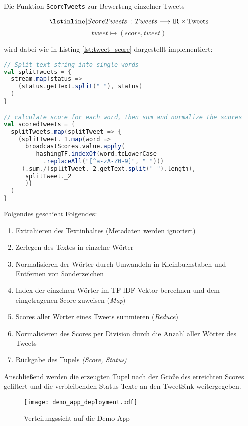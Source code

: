 Die Funktion \lstinline|ScoreTweets| zur Bewertung einzelner Tweets

\[\lstinline|ScoreTweets|: Tweets \longrightarrow \rm I\!R \times Tweets\]
\[tweet \mapsto (score, tweet)\]

wird dabei wie in Listing \ref{lst:tweet_score} dargestellt implementiert:

\begin{lstlisting}[language=Scala,caption={Bewertung von Tweets},label={lst:tweet_score}]
// Split text string into single words
val splitTweets = {
  stream.map(status =>
    (status.getText.split(" "), status)
  )
}

// calculate score for each word, then sum and normalize the scores
val scoredTweets = {
  splitTweets.map(splitTweet => {
    (splitTweet._1.map(word =>
      broadcastScores.value.apply(
         hashingTF.indexOf(word.toLowerCase
           .replaceAll("[^a-zA-Z0-9]", " ")))
     ).sum./(splitTweet._2.getText.split(" ").length),
      splitTweet._2
      )}
  )
}
\end{lstlisting}

Folgendes geschieht Folgendes:
\begin{enumerate}
	\item Extrahieren des Textinhaltes (Metadaten werden ignoriert)
	\item Zerlegen des Textes in einzelne Wörter
	\item Normalisieren der Wörter durch Umwandeln in Kleinbuchstaben und Entfernen von Sonderzeichen
	\item Index der einzelnen Wörter im TF-IDF-Vektor berechnen und dem eingetragenen Score zuweisen (\textit{Map})
	\item Scores aller Wörter eines Tweets summieren (\textit{Reduce})
	\item Normalisieren des Scores per Division durch die Anzahl aller Wörter des Tweets
	\item Rückgabe des Tupels \textit{(Score, Status)}
\end{enumerate}

Anschließend werden die erzeugten Tupel nach der Größe des erreichten Scores gefiltert und die verbleibenden Status-Texte an den TweetSink weitergegeben.\\

\begin{figure}[ht!]
	\centering
  \texttt{[image: demo\_app\_deployment.pdf]}
	\caption{Verteilungssicht auf die Demo App}
	\label{figure:demo_app_verteilung}
\end{figure}

